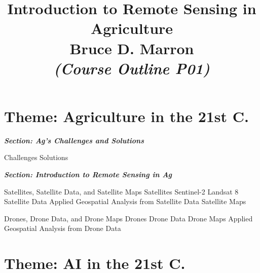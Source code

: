 \documentclass[12pt, letterpaper]{article}
\title{\vspace{-5mm}\fontsize{14pt}{12pt}
                    \selectfont \textbf{Introduction to Remote Sensing in Agriculture}\\  %
                   \vspace{2mm}
                   Bruce D. Marron \\
                   \vspace{2mm}
                   \textit{(Course Outline P01)}
      }
\author{
     \vspace{-20mm}
}
\date{}
\begin{document}
\begin{singlespacing}
\maketitle                                      %
\end{singlespacing}
\thispagestyle{fancy}                            %


\section{Theme: Agriculture in the 21st C.}

\large
\begin{flushleft}
\textbf{\textit{Section: Ag's Challenges and Solutions}}
\end{flushleft}
\normalsize

\begin{outline}[enumerate]
\1 Challenges
\2
\1 Solutions
\2 


\end{outline}


\large
\begin{flushleft}
\textbf{\textit{Section: Introduction to Remote Sensing in Ag}}
\end{flushleft}
\normalsize

\begin{outline}[enumerate]

\1 Satellites, Satellite Data, and Satellite Maps
\2 Satellites
\3 Sentinel-2
\3 Landsat 8
\2 Satellite Data
\3 Applied Geospatial Analysis from Satellite Data
\2 Satellite Maps
\3 

\1 Drones, Drone Data, and Drone Maps
\2 Drones
\3
\2 Drone Data
\3 
\2 Drone Maps
\3 Applied Geospatial Analysis from Drone Data
\2 
\end{outline}

\section{Theme: AI in the 21st C.}
\end{document}
